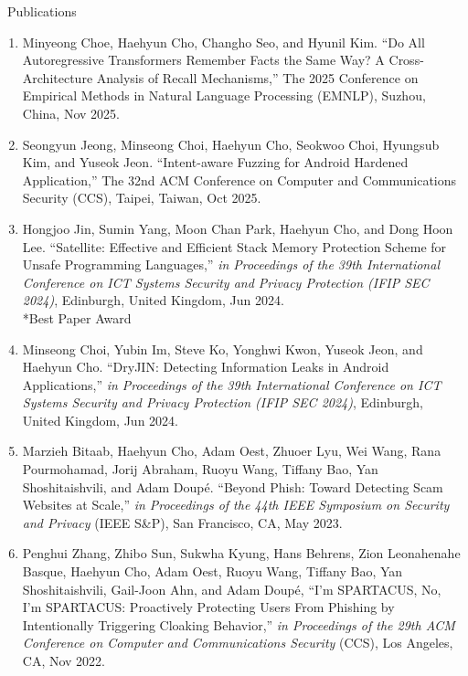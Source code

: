\documentclass{resume} %
\begin{document}
\begin{rSection}{\faGenderless~Publications}
\begin{enumerate}[leftmargin=0pt]
        \item Minyeong Choe, {Haehyun Cho}, Changho Seo, and Hyunil Kim.
        ``Do All Autoregressive Transformers Remember Facts the Same Way? A Cross-Architecture Analysis of Recall Mechanisms,''
        The 2025 Conference on Empirical Methods in Natural Language Processing (EMNLP), Suzhou, China, Nov 2025.

    	\item Seongyun Jeong, Minseong Choi, {Haehyun Cho}, Seokwoo Choi, Hyungsub Kim, and Yuseok Jeon.
		``Intent-aware Fuzzing for Android Hardened Application,''
        The 32nd ACM Conference on Computer and Communications Security (CCS), Taipei, Taiwan, Oct 2025.

    	\item Hongjoo Jin, Sumin Yang, Moon Chan Park, {Haehyun Cho}, and Dong Hoon Lee.
    	``Satellite: Effective and Efficient Stack Memory Protection Scheme for Unsafe Programming Languages,''
    	\emph{in Proceedings of the 39th International Conference on ICT Systems Security and Privacy Protection (IFIP SEC 2024)},
    	Edinburgh, United Kingdom, Jun 2024.\\
    	{*}Best Paper Award

    	\item Minseong Choi, Yubin Im, Steve Ko, Yonghwi Kwon, Yuseok Jeon, and {Haehyun Cho}.
    	``DryJIN: Detecting Information Leaks in Android Applications,''
    	\emph{in Proceedings of the 39th International Conference on ICT Systems Security and Privacy Protection (IFIP SEC 2024)},
    	Edinburgh, United Kingdom, Jun 2024.

		\item Marzieh Bitaab, {Haehyun Cho}, Adam Oest, Zhuoer Lyu, Wei Wang, Rana Pourmohamad, Jorij Abraham, Ruoyu Wang, Tiffany Bao, Yan Shoshitaishvili, and Adam Doup\'e.
		``Beyond Phish: Toward Detecting Scam Websites at Scale,''
		\emph{in Proceedings of the 44th IEEE Symposium on Security and Privacy} {(IEEE S\&P)},
    	San Francisco, CA, May 2023.
		
		\item Penghui Zhang, Zhibo Sun, Sukwha Kyung, Hans Behrens, Zion Leonahenahe Basque, {Haehyun Cho}, Adam Oest, Ruoyu Wang, Tiffany Bao, Yan Shoshitaishvili, Gail-Joon Ahn, and Adam Doup\'e, 
		``I'm SPARTACUS, No, I'm SPARTACUS: Proactively Protecting Users From Phishing by Intentionally Triggering Cloaking Behavior,''
		\emph{in Proceedings of the 29th ACM Conference on Computer and Communications Security} {(CCS)},
		Los Angeles, CA, Nov 2022.


\end{enumerate}
\end{rSection}
\end{document}
